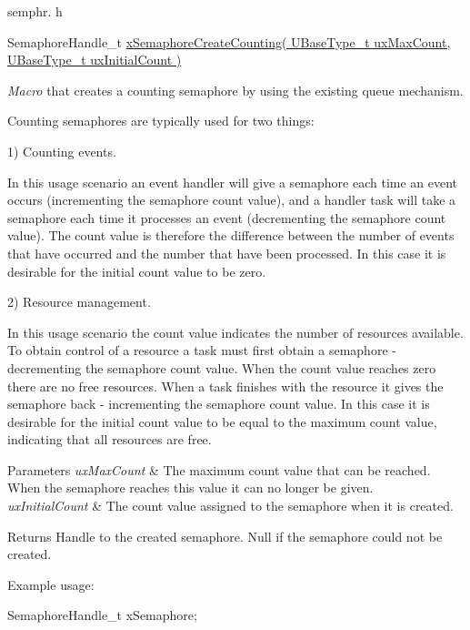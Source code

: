 semphr. h 
\begin{DoxyPre}SemaphoreHandle\_t \hyperlink{vendor_2ceedling_2plugins_2freertos_2src_2freertos_2include_2semphr_8h_a7764616a918a46115403569a88148ad4}{xSemaphoreCreateCounting( UBaseType\_t uxMaxCount, UBaseType\_t uxInitialCount )}\end{DoxyPre}


{\itshape Macro} that creates a counting semaphore by using the existing queue mechanism.

Counting semaphores are typically used for two things\+:

1) Counting events.

In this usage scenario an event handler will \textquotesingle{}give\textquotesingle{} a semaphore each time an event occurs (incrementing the semaphore count value), and a handler task will \textquotesingle{}take\textquotesingle{} a semaphore each time it processes an event (decrementing the semaphore count value). The count value is therefore the difference between the number of events that have occurred and the number that have been processed. In this case it is desirable for the initial count value to be zero.

2) Resource management.

In this usage scenario the count value indicates the number of resources available. To obtain control of a resource a task must first obtain a semaphore -\/ decrementing the semaphore count value. When the count value reaches zero there are no free resources. When a task finishes with the resource it \textquotesingle{}gives\textquotesingle{} the semaphore back -\/ incrementing the semaphore count value. In this case it is desirable for the initial count value to be equal to the maximum count value, indicating that all resources are free.


\begin{DoxyParams}{Parameters}
{\em ux\+Max\+Count} & The maximum count value that can be reached. When the semaphore reaches this value it can no longer be \textquotesingle{}given\textquotesingle{}.\\
\hline
{\em ux\+Initial\+Count} & The count value assigned to the semaphore when it is created.\\
\hline
\end{DoxyParams}
\begin{DoxyReturn}{Returns}
Handle to the created semaphore. Null if the semaphore could not be created.
\end{DoxyReturn}
Example usage\+: 
\begin{DoxyPre}
SemaphoreHandle\_t xSemaphore;\end{DoxyPre}




